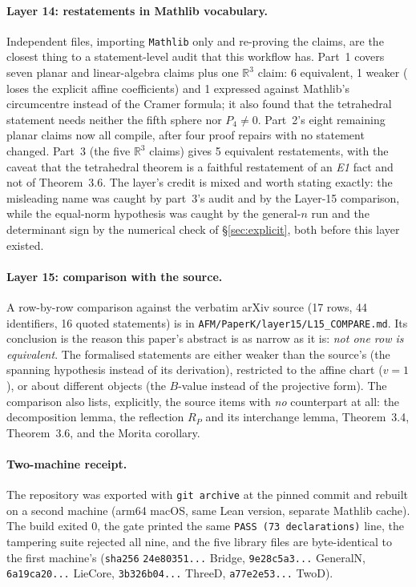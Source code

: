 \documentclass[11pt]{article}
\theoremstyle{definition}
\theoremstyle{remark}
\newcommand{\RR}{\mathbb{R}}
\begin{document}
\paragraph{Layer 14: restatements in Mathlib vocabulary.} Independent files, importing
\texttt{Mathlib} only and re-proving the claims, are the closest thing to a statement-level audit
that this workflow has. Part~1 covers seven planar and linear-algebra claims plus one $\RR^3$ claim: 6 equivalent, 1 weaker
( loses the explicit affine coefficients) and 1 expressed against Mathlib's
circumcentre instead of the Cramer formula; it also found that the tetrahedral statement needs
neither the fifth sphere nor $P_4\neq0$. Part~2's eight remaining planar claims now all compile,
after four proof repairs with no statement changed. Part~3 (the five $\RR^3$ claims) gives 5
equivalent restatements, with the caveat that the tetrahedral theorem is a faithful restatement of
an \emph{E1} fact and not of Theorem~3.6. The layer's credit is mixed and worth stating exactly: the
misleading name was caught by part~3's audit and by the Layer-15 comparison, while the equal-norm
hypothesis was caught by the general-$n$ run and the determinant sign by the numerical check of
\S\ref{sec:explicit}, both before this layer existed.

\paragraph{Layer 15: comparison with the source.} A row-by-row comparison against the verbatim
arXiv source (17 rows, 44 identifiers, 16 quoted statements) is in
\texttt{AFM/PaperK/layer15/L15\_COMPARE.md}. Its conclusion is the reason this paper's abstract is
as narrow as it is: \emph{not one row is equivalent}. The formalised statements are either weaker
than the source's (the spanning hypothesis instead of its derivation), restricted to the affine chart
($v=1$), or about different objects (the $B$-value instead of the projective form). The comparison
also lists, explicitly, the source items with \emph{no} counterpart at all: the decomposition lemma,
the reflection $R_P$ and its interchange lemma, Theorem~3.4, Theorem~3.6, and the Morita corollary.

\paragraph{Two-machine receipt.} The repository was exported with \texttt{git archive} at the
pinned commit and rebuilt on a second machine (arm64 macOS, same Lean version, separate Mathlib
cache). The build exited 0, the gate printed the same \texttt{PASS (73 declarations)} line, the
tampering suite rejected all nine, and the five library files are byte-identical to the first
machine's (\texttt{sha256} \texttt{24e80351...} Bridge, \texttt{9e28c5a3...} GeneralN,
\texttt{6a19ca20...} LieCore, \texttt{3b326b04...} ThreeD, \texttt{a77e2e53...} TwoD).
\end{document}
